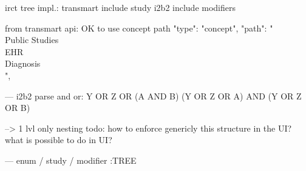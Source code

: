 
irct tree impl.: transmart include study
i2b2 include modifiers


from transmart api: OK to use concept path
 "type": "concept",
                "path": "\\Public Studies\\EHR\\Diagnosis\\",


---
i2b2 parse and or:
Y OR Z OR (A AND B)
(Y OR Z OR A) AND (Y OR Z OR B)

--> 1 lvl only nesting
todo: how to enforce genericly this structure in the UI? what is possible to do in UI?

---
enum / study / modifier :TREE